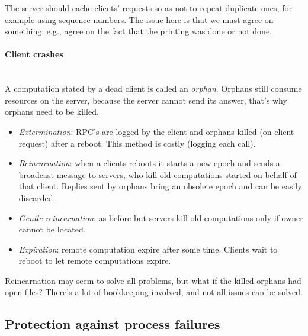 \documentclass[10pt,a4paper]{article}
\newcommand{\myparagraph}[1]{\paragraph{#1}\mbox{}\\[0.05in]}
\begin{document}
The server should cache clients' requests so as not to repeat duplicate ones, for example using sequence numbers. The issue here is that we must agree on something: e.g., agree on the fact that the printing was done or not done.
\myparagraph{Client crashes}
A computation stated by a dead client is called an \textit{orphan}. Orphans still consume resources on the server, because the server cannot send its answer, that's why orphans need to be killed.
\begin{itemize}
	\item \textit{Extermination}: RPC's are logged by the client and orphans killed (on client request) after a reboot. This method is costly (logging each call).
	\item \textit{Reincarnation}: when a clients reboots it starts a new epoch and sends a broadcast message to servers, who kill old computations started on behalf of that client. Replies sent by orphans bring an obsolete epoch and can be easily discarded.
	\item \textit{Gentle reincarnation}: as before but servers kill old computations only if owner cannot be located.
	\item \textit{Expiration}: remote computation expire after some time. Clients wait to reboot to let remote computations expire.
\end{itemize}
Reincarnation may seem to solve all problems, but what if the killed orphans had open files? There's a lot of bookkeeping  involved, and not all issues can be solved.
\subsection{Protection against process failures}
\end{document}
